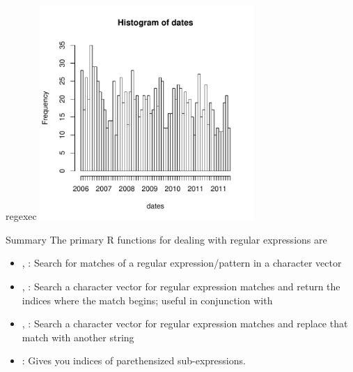 \documentclass[aspectratio=169]{beamer}
\begin{document}
\begin{frame}[fragile]{regexec}
\includegraphics[height=3.2in]{homicide-month}
\end{frame}


\begin{frame}{Summary}
The primary R functions for dealing with regular expressions are
\begin{itemize}
\item {}, : Search for matches of a regular
  expression/pattern in a character vector
\item {}, : Search a character vector for regular
  expression matches and return the indices where the match begins;
  useful in conjunction with 
\item {}, : Search a character vector for regular
  expression matches and replace that match with another string
\item {}: Gives you indices of parethensized sub-expressions.
\end{itemize}
\end{frame}
\end{document}
